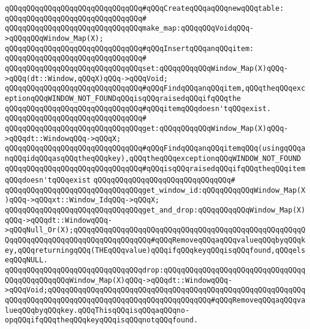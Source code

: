 \newline
\verb|qQQqqQQqqQQqqQQqqQQqqQQqqQQqqQQq#qQQqCreateqQQqaqQQqnewqQQqtable:|\newline
\verb|qQQqqQQqqQQqqQQqqQQqqQQqqQQqqQQq#|\newline
\verb|qQQqqQQqqQQqqQQqqQQqqQQqqQQqqQQqmake_map:qQQqqQQqVoidqQQq->qQQqqQQqWindow_Map(X);|\newline
\newline
\verb|qQQqqQQqqQQqqQQqqQQqqQQqqQQqqQQq#qQQqInsertqQQqanqQQqitem:|\newline
\verb|qQQqqQQqqQQqqQQqqQQqqQQqqQQqqQQq#|\newline
\verb|qQQqqQQqqQQqqQQqqQQqqQQqqQQqqQQqset:qQQqqQQqqQQqWindow_Map(X)qQQq->qQQq(dt::Window,qQQqX)qQQq->qQQqVoid;|\newline
\newline
\verb|qQQqqQQqqQQqqQQqqQQqqQQqqQQqqQQq#qQQqFindqQQqanqQQqitem,qQQqtheqQQqexceptionqQQqWINDOW_NOT_FOUNDqQQqisqQQqraisedqQQqifqQQqthe|\newline
\verb|qQQqqQQqqQQqqQQqqQQqqQQqqQQqqQQq#qQQqitemqQQqdoesn'tqQQqexist.|\newline
\verb|qQQqqQQqqQQqqQQqqQQqqQQqqQQqqQQq#|\newline
\verb|qQQqqQQqqQQqqQQqqQQqqQQqqQQqqQQqget:qQQqqQQqqQQqWindow_Map(X)qQQq->qQQqdt::WindowqQQq->qQQqX;|\newline
\newline
\verb|qQQqqQQqqQQqqQQqqQQqqQQqqQQqqQQq#qQQqFindqQQqanqQQqitemqQQq(usingqQQqanqQQqidqQQqasqQQqtheqQQqkey),qQQqtheqQQqexceptionqQQqWINDOW_NOT_FOUND|\newline
\verb|qQQqqQQqqQQqqQQqqQQqqQQqqQQqqQQq#qQQqisqQQqraisedqQQqifqQQqtheqQQqitemqQQqdoesn'tqQQqexist|\newline
\verb|qQQqqQQqqQQqqQQqqQQqqQQqqQQqqQQq#|\newline
\verb|qQQqqQQqqQQqqQQqqQQqqQQqqQQqqQQqget_window_id:qQQqqQQqqQQqWindow_Map(X)qQQq->qQQqxt::Window_IdqQQq->qQQqX;|\newline
\newline
\verb|qQQqqQQqqQQqqQQqqQQqqQQqqQQqqQQqget_and_drop:qQQqqQQqqQQqWindow_Map(X)qQQq->qQQqdt::WindowqQQq->qQQqNull_Or(X);qQQqqQQqqQQqqQQqqQQqqQQqqQQqqQQqqQQqqQQqqQQqqQQqqQQqqQQqqQQqqQQqqQQqqQQqqQQqqQQqqQQqqQQq#qQQqRemoveqQQqaqQQqvalueqQQqbyqQQqkey,qQQqreturningqQQq(THEqQQqvalue)qQQqifqQQqkeyqQQqisqQQqfound,qQQqelseqQQqNULL.|\newline
\verb|qQQqqQQqqQQqqQQqqQQqqQQqqQQqqQQqdrop:qQQqqQQqqQQqqQQqqQQqqQQqqQQqqQQqqQQqqQQqqQQqqQQqWindow_Map(X)qQQq->qQQqdt::WindowqQQq->qQQqVoid;qQQqqQQqqQQqqQQqqQQqqQQqqQQqqQQqqQQqqQQqqQQqqQQqqQQqqQQqqQQqqQQqqQQqqQQqqQQqqQQqqQQqqQQqqQQqqQQqqQQqqQQqqQQq#qQQqRemoveqQQqaqQQqvalueqQQqbyqQQqkey.qQQqThisqQQqisqQQqaqQQqno-opqQQqifqQQqtheqQQqkeyqQQqisqQQqnotqQQqfound.|\newline
